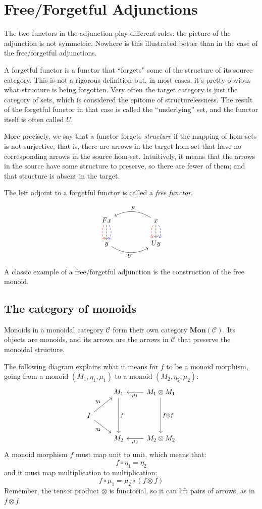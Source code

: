 \documentclass[DaoFP]{subfiles}
\begin{document}
\section{Free/Forgetful Adjunctions}
The two functors in the adjunction play different roles: the picture of the adjunction is not symmetric. Nowhere is this illustrated better than in the case of the free/forgetful adjunctions. 

A forgetful functor is a functor that ``forgets'' some of the structure of its source category. This is not a rigorous definition but, in most cases, it's pretty obvious what structure is being forgotten. Very often the target category is just the category of sets, which is considered the epitome of structurelessness. The result of the forgetful functor in that case is called the ``underlying'' set, and the functor itself is often called $U$. 

More precisely, we say that a functor forgets \emph{structure} if the mapping of hom-sets is not surjective, that is, there are arrows in the target hom-set that have no corresponding arrows in the source hom-set. Intuitively, it means that the arrows in the source have some structure to preserve, so there are fewer of them; and that structure is absent in the target. 

The left adjoint to a forgetful functor is called a \emph{free functor}.

\[
 \begin{tikzcd}
F x
\arrow[d, bend right, red, dashed]
\arrow[d, dashed]
\arrow[d, bend left, blue, dashed]
  &&
  x
\arrow[d, bend right, red, dashed]
\arrow[d, dashed]
\arrow[d, bend left, blue, dashed]
 \arrow[ll, bend right, "F"']
 \\
y
   \arrow[rr, bend right, "U"']
 &&
 U y
  \end{tikzcd}
\]

A classic example of a free/forgetful adjunction is the construction of the free monoid.


\subsection{The category of monoids}
Monoids in a monoidal category $\mathcal{C}$ form their own category $\mathbf{Mon}(\mathcal{C})$. Its objects are monoids, and its arrows are the arrows in $\mathcal{C}$ that preserve the monoidal structure. 

The following diagram explains what it means for $f$ to be a monoid morphism, going from a monoid $(M_1, \eta_1, \mu_1)$ to a monoid $(M_2, \eta_2, \mu_2)$:
\[
 \begin{tikzcd}
 & M_1
 \arrow[dd, "f"]
 & M_1 \otimes M_1
 \arrow[l, "\mu_1"]
 \arrow[dd, "f \otimes f"]
 \\
 I
 \arrow[ru, "\eta_1"]
 \arrow[rd, "\eta_2"']
 \\
 & M_2
 & M_2 \otimes M_2
 \arrow[l, "\mu_2"]
  \end{tikzcd}
\]
A monoid morphism $f$ must map unit to unit, which means that:
\[ f \circ \eta_1 = \eta_2 \]
and it must map multiplication to multiplication:
\[ f \circ \mu_1 = \mu_2 \circ (f \otimes f)\]
Remember, the tensor product $\otimes$ is functorial, so it can lift pairs of arrows, as in $f \otimes f$.
\end{document}
